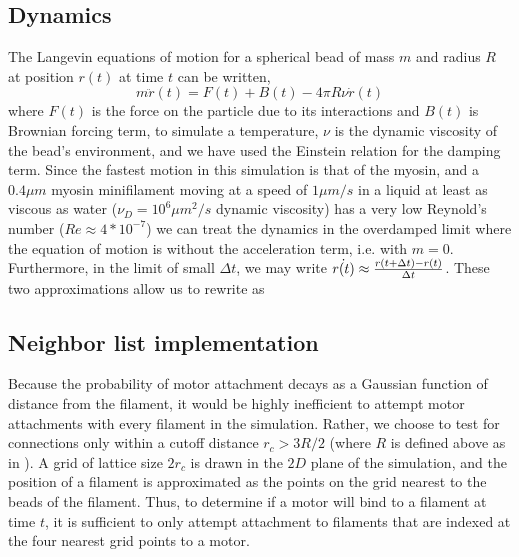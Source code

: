 \documentclass[12pt]{article}
\begin{document}
\subsection{Dynamics}
The Langevin equations of motion for a spherical
bead of mass $m$ and radius $R$ at position $r(t)$ at time $t$ can be written,
\begin{equation}
  m\ddot{r}(t) = F(t) + B(t) - 4\pi R\nu \dot{r}(t)
  \label{eqn:lang}
\end{equation} 
where $F(t)$ is the force on the particle due to its interactions and $B(t)$ is
Brownian forcing term, to simulate a temperature, $\nu$ is the dynamic viscosity
of the bead's environment, and we have used the Einstein relation for the
damping term. Since the fastest motion in this simulation is that of the myosin,
and a $0.4\mu m$ myosin minifilament moving at a speed of $1\mu m/s$ in a liquid
at least as viscous as water ($\nu_D=10^6\mu m^2/s$ dynamic viscosity) has a
very low Reynold's number ($Re \approx 4*10^{-7}$) we can treat the dynamics in
the overdamped limit where the equation of motion is  without the
acceleration term, i.e. with $m=0$. Furthermore, in the limit of small
$\Delta t$, we may write $\dot{r(t)} \approx {r(t+\Delta t)-r(t)\over \Delta t}$.
These two approximations allow us to rewrite  as  
\subsection{Neighbor list implementation}
Because the probability of motor attachment decays as a Gaussian function of
distance from the filament, it would be highly inefficient to attempt motor
attachments with every filament in the simulation.  Rather, we choose to test
for connections only within a cutoff distance
$r_c>3R/2$ (where $R$ is defined above as in ). A grid of
lattice size $2r_c$ is drawn in the $2D$ plane of the simulation, and the
position of a filament is approximated as the points on the grid nearest to the
beads of the filament. Thus, to determine if a motor will bind to a filament at
time $t$, it is sufficient to only attempt attachment to filaments that are
indexed at the four nearest grid points to a motor. 
\end{document}
